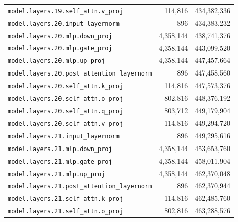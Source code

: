 \documentclass[10pt,a4paper]{article}
\theoremstyle{definition}
\begin{document}
\begin{appendices}
\begin{longtable}{p{9.5cm}rr}
\texttt{model.\allowbreak{}layers.\allowbreak{}19.\allowbreak{}self\_attn.\allowbreak{}v\_proj} & 114,816 & 434,382,336 \\
\texttt{model.\allowbreak{}layers.\allowbreak{}20.\allowbreak{}input\_layernorm} & 896 & 434,383,232 \\
\texttt{model.\allowbreak{}layers.\allowbreak{}20.\allowbreak{}mlp.\allowbreak{}down\_proj} & 4,358,144 & 438,741,376 \\
\texttt{model.\allowbreak{}layers.\allowbreak{}20.\allowbreak{}mlp.\allowbreak{}gate\_proj} & 4,358,144 & 443,099,520 \\
\texttt{model.\allowbreak{}layers.\allowbreak{}20.\allowbreak{}mlp.\allowbreak{}up\_proj} & 4,358,144 & 447,457,664 \\
\texttt{model.\allowbreak{}layers.\allowbreak{}20.\allowbreak{}post\_attention\_layernorm} & 896 & 447,458,560 \\
\texttt{model.\allowbreak{}layers.\allowbreak{}20.\allowbreak{}self\_attn.\allowbreak{}k\_proj} & 114,816 & 447,573,376 \\
\texttt{model.\allowbreak{}layers.\allowbreak{}20.\allowbreak{}self\_attn.\allowbreak{}o\_proj} & 802,816 & 448,376,192 \\
\texttt{model.\allowbreak{}layers.\allowbreak{}20.\allowbreak{}self\_attn.\allowbreak{}q\_proj} & 803,712 & 449,179,904 \\
\texttt{model.\allowbreak{}layers.\allowbreak{}20.\allowbreak{}self\_attn.\allowbreak{}v\_proj} & 114,816 & 449,294,720 \\
\texttt{model.\allowbreak{}layers.\allowbreak{}21.\allowbreak{}input\_layernorm} & 896 & 449,295,616 \\
\texttt{model.\allowbreak{}layers.\allowbreak{}21.\allowbreak{}mlp.\allowbreak{}down\_proj} & 4,358,144 & 453,653,760 \\
\texttt{model.\allowbreak{}layers.\allowbreak{}21.\allowbreak{}mlp.\allowbreak{}gate\_proj} & 4,358,144 & 458,011,904 \\
\texttt{model.\allowbreak{}layers.\allowbreak{}21.\allowbreak{}mlp.\allowbreak{}up\_proj} & 4,358,144 & 462,370,048 \\
\texttt{model.\allowbreak{}layers.\allowbreak{}21.\allowbreak{}post\_attention\_layernorm} & 896 & 462,370,944 \\
\texttt{model.\allowbreak{}layers.\allowbreak{}21.\allowbreak{}self\_attn.\allowbreak{}k\_proj} & 114,816 & 462,485,760 \\
\texttt{model.\allowbreak{}layers.\allowbreak{}21.\allowbreak{}self\_attn.\allowbreak{}o\_proj} & 802,816 & 463,288,576 \\

\end{longtable}
\end{appendices}
\end{document}
